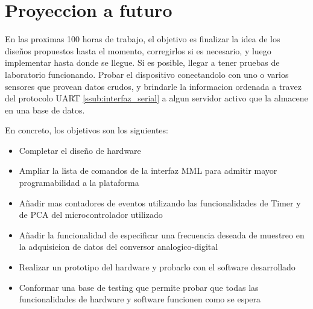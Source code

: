 \section{Proyeccion a futuro} %
\label{sec:proyeccion_a_futuro}

En las proximas 100 horas de trabajo, el objetivo es finalizar la idea de los dise\~nos propuestos hasta el momento, corregirlos si es necesario, y luego implementar hasta donde se llegue. Si es posible, llegar a tener pruebas de laboratorio funcionando. Probar el dispositivo conectandolo con uno o varios sensores que provean datos crudos, y brindarle la informacion ordenada a travez del protocolo UART \ref{ssub:interfaz_serial} a algun servidor activo que la almacene en una base de datos.

En concreto, los objetivos son los siguientes:
\begin{itemize}
	\item Completar el dise\~no de hardware
	\item Ampliar la lista de comandos de la interfaz MML para admitir mayor programabilidad a la plataforma
	\item Añadir mas contadores de eventos utilizando las funcionalidades de Timer y de PCA del microcontrolador utilizado
	\item Añadir la funcionalidad de especificar una frecuencia deseada de muestreo en la adquisicion de datos del conversor analogico-digital
	\item Realizar un prototipo del hardware y probarlo con el software desarrollado
	\item Conformar una base de testing que permite probar que todas las funcionalidades de hardware y software funcionen como se espera
\end{itemize}


